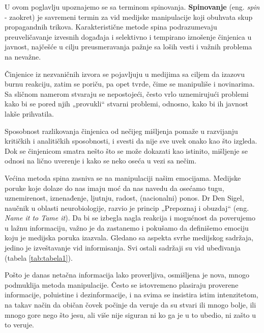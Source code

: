 \documentclass[a4paper]{article}
\begin{document}
U ovom poglavlju upoznajemo se sa terminom spinovanja. \textbf{Spinovanje} (eng. \emph{spin} - zaokret) je savremeni termin za vid medijske manipulacije koji obuhvata skup propagandnih trikova. Karakteristične metode spina podrazumevaju preuveličavanje izvesnih događaja i selektivno i tempirano iznošenje činjenica u javnost, najčešće u cilju preusmeravanja pažnje sa loših vesti i važnih problema na nevažne.

Činjenice iz nezvaničnih izvora se pojavljuju u medijima sa ciljem da izazovu burnu reakciju, zatim se poriču, pa opet tvrde, čime se manipuliše i novinarima. Sa sličnom namerom stvaraju se nepostojeći, često vrlo uznemirujući problemi kako bi se pored njih „provukli“ stvarni problemi, odnosno, kako bi ih javnost lakše prihvatila. 

Sposobnost razlikovanja činjenica od nečijeg mišljenja pomaže u razvijanju kritičkih i analitičkih sposobnosti, i svesti da nije sve uvek onako kao što izgleda. Dok se činjenicom smatra nešto što se može dokazati kao istinito, mišljenje se odnosi na lično uverenje i kako se neko oseća u vezi sa nečim. 

Većina metoda spina zasniva se na manipulaciji našim emocijama. Medijske poruke koje dolaze do nas imaju moć da nas navedu da osećamo tugu, uznemirenost, iznenađenje, ljutnju, radost, (nacionalni) ponos. Dr Den Sigel, naučnik u oblasti neurobiologije, razvio je princip „Prepoznaj i obuzdaj“ \cite {nameittotameit} (eng. \emph{Name it to Tame it}). Da bi se izbegla nagla reakcija i mogućnost da poverujemo u lažnu informaciju, važno je da zastanemo i pokušamo da definišemo emociju koju je medijska poruka izazvala. Gledano sa aspekta svrhe medijskog sadržaja, jedino je izveštavanje vid informisanja. Svi ostali sadržaji su vid ubeđivanja (tabela \ref{tab:tabela1}). 

Pošto je danas netačna informacija lako proverljiva, osmišljena je nova, mnogo podmuklija metoda manipulacije. Često se istovremeno plasiraju proverene informacije, poluistine i  dezinformacije, i na svima se insistira istim intenzitetom, na takav način da običan čovek počinje da veruje da su stvari ili mnogo bolje, ili mnogo gore nego što jesu, ali više nije siguran ni ko ga je u to ubedio, ni zašto u to veruje.
\end{document}
